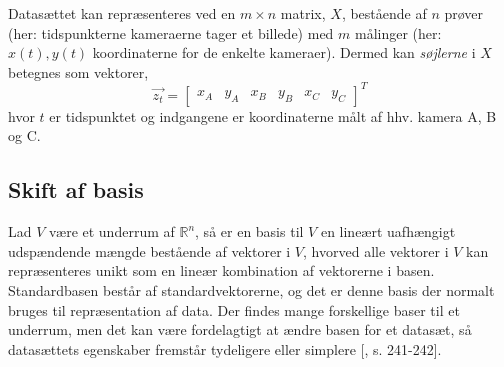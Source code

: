 Datasættet kan repræsenteres ved en $m \times n$ matrix, $X$, bestående af $n$ prøver (her: tidspunkterne kameraerne tager et billede) med $m$ målinger (her: $x(t), y(t)$ koordinaterne for de enkelte kameraer). Dermed kan \emph{søjlerne} i $X$ betegnes som vektorer, $$ \vec{z_t}=\begin{bmatrix} x_{A} & y_{A} & x_{B} & y_{B} & x_{C} & y_{C} \end{bmatrix}^T $$ hvor $t$ er tidspunktet og indgangene er koordinaterne målt af hhv. kamera A, B og C.

\subsection*{Skift af basis}
Lad $V$ være et underrum af $\mathbb{R}^n$, så er en basis til $V$ en lineært uafhængigt udspændende mængde bestående af vektorer i $V$, hvorved alle vektorer i $V$ kan repræsenteres unikt som en lineær kombination af vektorerne i basen. \\
Standardbasen består af standardvektorerne, og det er denne basis der normalt bruges til repræsentation af data. Der findes mange forskellige baser til et underrum, men det kan være fordelagtigt at ændre basen for et datasæt, så datasættets egenskaber fremstår tydeligere eller simplere [\citet{linalg}, s. 241-242].

